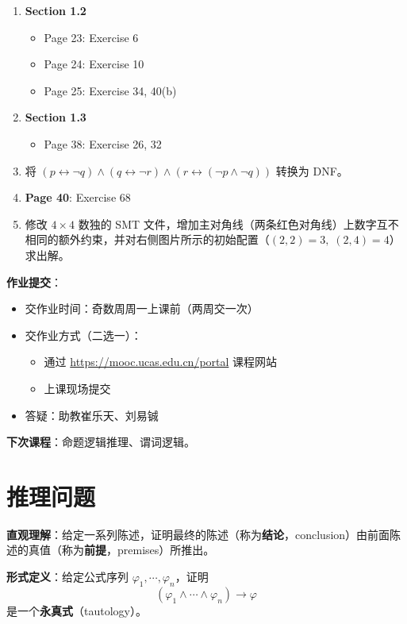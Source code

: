 \documentclass[UTF8,11pt,a4paper]{ctexbook}   %
\theoremstyle{definition}
\begin{document}
\begin{enumerate}
    \item \textbf{Section 1.2}
    \begin{itemize}
        \item Page 23: Exercise 6
        \item Page 24: Exercise 10
        \item Page 25: Exercise 34, 40(b)
    \end{itemize}
    \item \textbf{Section 1.3}
    \begin{itemize}
        \item Page 38: Exercise 26, 32
    \end{itemize}
    \item 将 $(p \leftrightarrow \neg q) \land (q \leftrightarrow \neg r) \land (r \leftrightarrow (\neg p \land \neg q))$ 转换为 DNF。
    \item \textbf{Page 40}: Exercise 68
    \item 修改 $4 \times 4$ 数独的 SMT 文件，增加主对角线（两条红色对角线）上数字互不相同的额外约束，并对右侧图片所示的初始配置（$(2,2)=3,\; (2,4)=4$）求出解。
\end{enumerate}

\textbf{作业提交}：
\begin{itemize}
    \item 交作业时间：奇数周周一上课前（两周交一次）
    \item 交作业方式（二选一）：
    \begin{itemize}
        \item 通过 \url{https://mooc.ucas.edu.cn/portal} 课程网站
        \item 上课现场提交
    \end{itemize}
    \item 答疑：助教崔乐天、刘易铖
\end{itemize}

\textbf{下次课程}：命题逻辑推理、谓词逻辑。

\section{推理问题}

\textbf{直观理解}：给定一系列陈述，证明最终的陈述（称为\textbf{结论}，conclusion）由前面陈述的真值（称为\textbf{前提}，premises）所推出。

\textbf{形式定义}：给定公式序列 $\varphi_1,\cdots,\varphi_n$，证明
\[
(\varphi_1\land\cdots\land\varphi_n)\to\varphi
\]
是一个\textbf{永真式}（tautology）。
\end{document}
